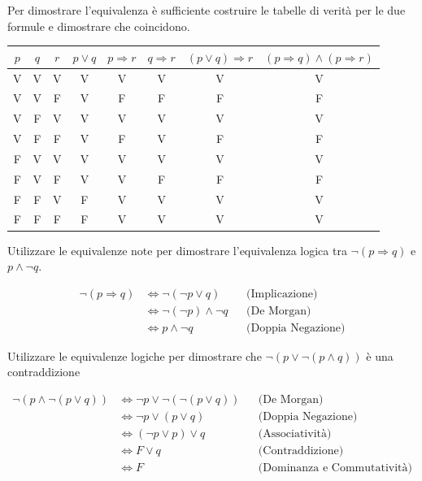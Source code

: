 \begin{soluzione}
Per dimostrare l'equivalenza è sufficiente costruire le tabelle di verità per le due formule e dimostrare che coincidono.
\begin{center}
\begin{tabular}{| c | c | c || c | c | c || c | c |}
    \hline
    $p$ & $q$ & $r$ & $p \lor q$ & $p \Rightarrow r$ & $q \Rightarrow r$ & $(p \lor q) \Rightarrow r$ & $(p \Rightarrow q) \land (p \Rightarrow r)$  \\
    \hline 
    V &V &V  &V &V &V &V &V \\ \hline
    V &V &F  &V &F &F &F &F \\ \hline
    V &F &V  &V &V &V &V &V \\ \hline
    V &F &F  &V &F &V &F &F \\ \hline
    F &V &V  &V &V &V &V &V \\ \hline
    F &V &F  &V &V &F &F &F \\ \hline
    F &F &V  &F &V &V &V &V \\ \hline
    F &F &F  &F &V &V &V &V \\ \hline
\end{tabular}
\end{center}
\end{soluzione}



\begin{esercizio}
Utilizzare le equivalenze note per dimostrare l'equivalenza logica tra $\neg(p \Rightarrow q)$ e $p \wedge \neg q$. 
\end{esercizio}

\begin{soluzione}
\begin{align*}
    \neg(p \Rightarrow q) & \iff \neg (\neg p \lor q) && \text{(Implicazione)}\\
    & \iff \neg (\neg p) \land \neg q && \text{(De Morgan)} \\
    & \iff  p \land \neg q && \text{(Doppia Negazione)}
\end{align*}
\end{soluzione}

\begin{esercizio}
Utilizzare le equivalenze logiche per dimostrare che $\neg(p \vee \neg(p \wedge q))$ è una contraddizione 
\end{esercizio}

\begin{soluzione}	
\begin{align*}
        \neg(p \land \neg(p \lor q)) & \iff \neg p \lor \neg(\neg (p \lor q)) && \text{(De Morgan)}\\
        & \iff \neg p \lor (p \lor q) && \text{(Doppia Negazione)}\\
        & \iff (\neg p \lor p) \lor q && \text{(Associatività)}\\
        & \iff F \lor q && \text{(Contraddizione)}\\
        & \iff F && \text{(Dominanza e Commutatività)}
\end{align*}
\end{soluzione}

